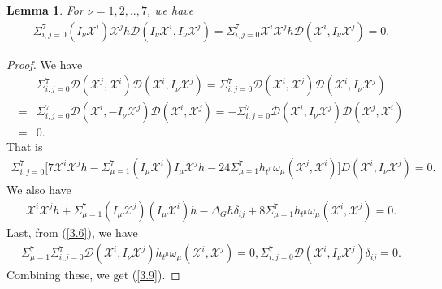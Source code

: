 \documentclass[10pt,a4paper]{amsart}
\numberwithin{equation}{section}
\newtheorem{lemma}[theorem]{Lemma}
\begin{document}
\begin{lemma} \label{lemma 3.1}
For $\nu=1,2,..,7$, we have
\begin{align}\label{3.9}
        \Sigma_{i,j=0}^7(I_\nu \mathscr{X}^i )\mathscr{X}^j h \mathcal{D}(I_\nu \mathscr{X}^i,I_\nu \mathscr{X}^j)= \Sigma_{i,j=0}^7 \mathscr{X}^i \mathscr{X}^j h \mathcal{D}( \mathscr{X}^i,I_\nu \mathscr{X}^j)=0.
    \end{align}
    \end{lemma}
  \begin{proof}
    We  have
    \begin{equation*}
        \begin{aligned}
    &\Sigma_{i,j=0}^7\mathcal{D}(\mathscr{X}^j,\mathscr{X}^i)\mathcal{D}(\mathscr{X}^i,I_\nu \mathscr{X}^j)=\Sigma_{i,j=0}^7\mathcal{D}(\mathscr{X}^i,\mathscr{X}^j)\mathcal{D}(\mathscr{X}^i,I_\nu \mathscr{X}^j)\\=&\Sigma_{i,j=0}^7\mathcal{D}(\mathscr{X}^i,-I_\nu \mathscr{X}^j)\mathcal{D}(\mathscr{X}^i, \mathscr{X}^j)=-\Sigma_{i,j=0}^7\mathcal{D}(\mathscr{X}^i,I_\nu \mathscr{X}^j)\mathcal{D}(\mathscr{X}^j, \mathscr{X}^i)\\=&0.
    \end{aligned}    \end{equation*}
That is
\begin{equation}\label{3.10}
\begin{aligned}
      \Sigma_{i,j=0}^7\bigg[7\mathscr{X}^i\mathscr{X}^j h-\Sigma_{\mu=1}^7(I_\mu \mathscr{X}^i) I_\mu \mathscr{X}^j h-24\Sigma_{\mu=1}^7h_{t^\mu}\omega_\mu (\mathscr{X}^j,\mathscr{X}^i)\bigg]D(\mathscr{X}^i,I_\nu \mathscr{X}^j)=0. 
    \end{aligned}
\end{equation}
We also have
\begin{align}
\mathscr{X}^i\mathscr{X}^jh+\Sigma_{\mu=1}^7(I_\mu \mathscr{X}^j)(I_\mu \mathscr{X}^i)h-\Delta_G h \delta_{ij}+8\Sigma_{\mu=1}^7h_{t^\mu}\omega_\mu (\mathscr{X}^i,\mathscr{X}^j)=0.
\end{align}
Last, from (\ref{3.6}), we have 
\begin{align}
   \Sigma_{\mu=1}^7 \Sigma_{i,j=0}^7 \mathcal{D}(\mathscr{X}^i,I_\nu \mathscr{X}^j)h_{t^\mu}\omega_\mu (\mathscr{X}^i,\mathscr{X}^j)=0, \Sigma_{i,j=0}^7\mathcal{D}(\mathscr{X}^i, I_\nu\mathscr{X}^j)\delta_{ij}=0.\end{align}
Combining these, we get (\ref{3.9}).
 \end{proof}  
\end{document}
